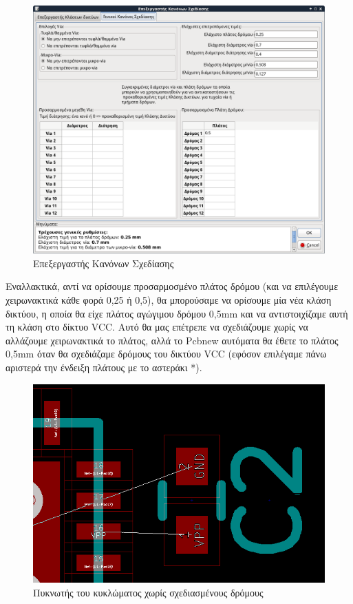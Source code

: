 \documentclass[a4paper]{article}
\begin{document}
\begin{figure}
  \begin{center}
    \includegraphics[width=.9\textwidth]{img/pcb-dial-custtrackw.png}
    \caption{Επεξεργαστής Κανόνων Σχεδίασης}
    \label{fig:pcb-dial-custtrackw}
  \end{center}
\end{figure}

Εναλλακτικά, αντί να ορίσουμε προσαρμοσμένο πλάτος δρόμου (και να  επιλέγουμε χειρωνακτικά κάθε φορά 0,25 ή 0,5), θα μπορούσαμε να ορίσουμε μία νέα κλάση δικτύου, η οποία θα είχε πλάτος αγώγιμου δρόμου 0,5mm και να αντιστοιχίζαμε αυτή τη κλάση στο δίκτυο VCC. Αυτό θα μας επέτρεπε να σχεδιάζουμε χωρίς να αλλάζουμε χειρωνακτικά το πλάτος, αλλά το Pcbnew αυτόματα θα έθετε το πλάτος 0,5mm όταν θα σχεδιάζαμε δρόμους του δικτύου VCC (εφόσον επιλέγαμε πάνω αριστερά την ένδειξη πλάτους με το αστεράκι *). 

\begin{figure}
  \begin{center}
    \includegraphics[width=.5\textwidth]{img/pcb-circ-notrack}
    \caption{Πυκνωτής του κυκλώματος χωρίς σχεδιασμένους δρόμους}
    \label{fig:pcb-circ-notrack}
  \end{center}
\end{figure}
\end{document}

